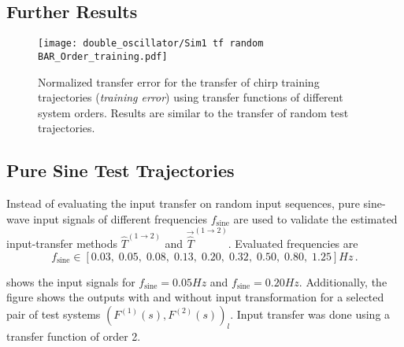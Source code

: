 \subsection{Further Results}\label{sec:sim1_further_results}
    \begin{figure}[h!]
        \centering
        \texttt{[image: double\_oscillator/Sim1 tf random BAR\_Order\_training.pdf]}
        \caption[Double Oscillator -- Transfer Error (Transfer Function Training Error)]{Normalized transfer error for the transfer of chirp training trajectories (\textit{training error}) using transfer functions of different system orders. Results are similar to the transfer of random test trajectories.}
        \label{fig:sim1_rand_tf_order_train}
    \end{figure}

\subsection{Pure Sine Test Trajectories}\label{subsec:app_sim1_sine}
 Instead of evaluating the input transfer on random input sequences, pure sine-wave input signals of different frequencies $f_{\mathrm{sine}}$ are used to validate the estimated input-transfer methods $\hat T^{(1 \rightarrow 2)}$ and $\vec{\hat T}^{(1 \rightarrow 2)}$. 
Evaluated frequencies are
\begin{equation}
	f_{\mathrm{sine}} \in [0.03,\; 0.05,\; 0.08,\; 0.13,\; 0.20,\; 0.32,\; 0.50,\; 0.80,\; 1.25]\unit{Hz}\,.
\end{equation}

 shows the input signals for  $f_{\mathrm{sine}}=0.05\unit{Hz}$ and $f_{\mathrm{sine}}=0.20\unit{Hz}$. Additionally, the figure shows the outputs with and without input transformation for a selected pair of test systems 
$\left(F^{(1)}(s), F^{(2)}(s)\right)_l$. Input transfer was done using a transfer function of order 2. %


